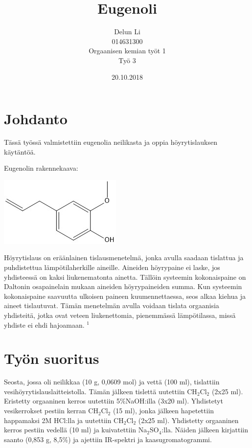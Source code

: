 \documentclass[11pt,a4paper]{article}
\title{Eugenoli}
\author{Delun Li\\014631300\\Orgaanisen kemian työt 1\\Työ 3}
\date{20.10.2018}
\begin{document}
\maketitle

\pagebreak


\section{Johdanto}

Tässä työssä valmistettiin eugenolia neilikasta ja oppia höyrytislauksen käytäntöä.

\vspace{0.3cm}

\noindent Eugenolin rakennekaava:

\hspace{2.5cm}\includegraphics[]{eugenoli.jpg}

\vspace{0.3cm}

\noindent Höyrytislaus on eräänlainen tislausmenetelmä, jonka avulla saadaan tislattua ja puhdistettua lämpötilaherkille aineille. Aineiden höyrypaine ei laske, jos yhdisteessä on kaksi liukenematonta ainetta. Tällöin systeemin kokonaispaine on Daltonin osapainelain mukaan aineiden höyrypaineiden summa. 
Kun systeemin kokonaispaine saavuutta ulkoisen paineen kuumennettaessa, seos alkaa kiehua ja aineet tislautuvat. Tämän menetelmän avulla voidaan tislata orgaanisia yhdisteitä, jotka ovat veteen liukenettomia, pienemmässä lämpötilassa, missä yhdiste ei ehdi hajoamaan. $^1$

\section{Työn suoritus}

Seosta, jossa oli neilikkaa (10 g, 0,0609 mol) ja vettä (100 ml), tislattiin vesihöyrytislauslaitteistolla. Tämän jälkeen tislettä uutettiin CH$_2$Cl$_2$ (2x25 ml). Eristetty orgaaninen kerros uutettiin 5$\%$NaOH:illa (3x20 ml). Yhdistetyt vesikerrokset pestiin kerran CH$_2$Cl$_2$ (15 ml), jonka jälkeen hapetettiin happamaksi 2M HCl:lla ja uutettiin CH$_2$Cl$_2$ (2x25 ml). Yhdistetty orgaaninen kerros pestiin vedellä (10 ml) ja kuivatettiin Na$_2$SO$_4$:lla. Näiden jälkeen kirjattiin saanto (0,853 g, 8,5$\%$) ja ajettiin IR-spektri ja kaasugromatogrammi.
\end{document}
